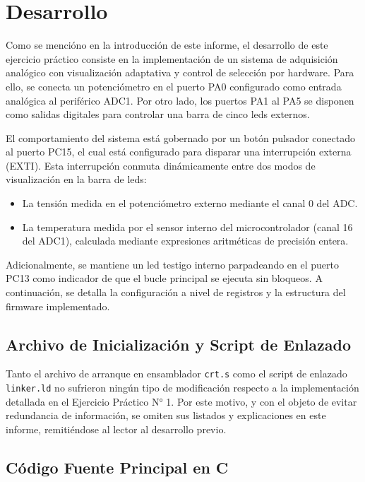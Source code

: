 \chapter{Desarrollo}
\label{ch:desarrollo}

Como se mencióno en la introducción de este informe, el desarrollo de este ejercicio práctico consiste en la implementación de un sistema de adquisición analógico
con visualización adaptativa y control de selección por hardware. Para ello, se conecta un potenciómetro en el
puerto PA0 configurado como entrada analógica al periférico ADC1. Por otro lado, los puertos PA1 al PA5 se disponen
como salidas digitales para controlar una barra de cinco leds externos. 

El comportamiento del sistema está gobernado por un botón pulsador conectado al puerto PC15, el cual está configurado
para disparar una interrupción externa (EXTI). Esta interrupción conmuta dinámicamente entre dos modos de
visualización en la barra de leds:
\begin{itemize}
    \item La tensión medida en el potenciómetro externo mediante el canal 0 del ADC.
    \item La temperatura medida por el sensor interno del microcontrolador (canal 16 del ADC1),
    calculada mediante expresiones aritméticas de precisión entera.
\end{itemize}

Adicionalmente, se mantiene un led testigo interno parpadeando en el puerto PC13 como indicador de que el bucle
principal se ejecuta sin bloqueos. A continuación, se detalla la configuración a nivel de registros y la estructura
del firmware implementado.

\section{Archivo de Inicialización y Script de Enlazado}
\label{sec.ej2:inicializacion}

Tanto el archivo de arranque en ensamblador \texttt{crt.s} como el script de enlazado \texttt{linker.ld} no sufrieron
ningún tipo de modificación respecto a la implementación detallada en el Ejercicio Práctico N° 1. Por este motivo,
y con el objeto de evitar redundancia de información, se omiten sus listados y explicaciones en este informe,
remitiéndose al lector al desarrollo previo.

\section{Código Fuente Principal en C}
\label{sec.ej2:codigo_c}

